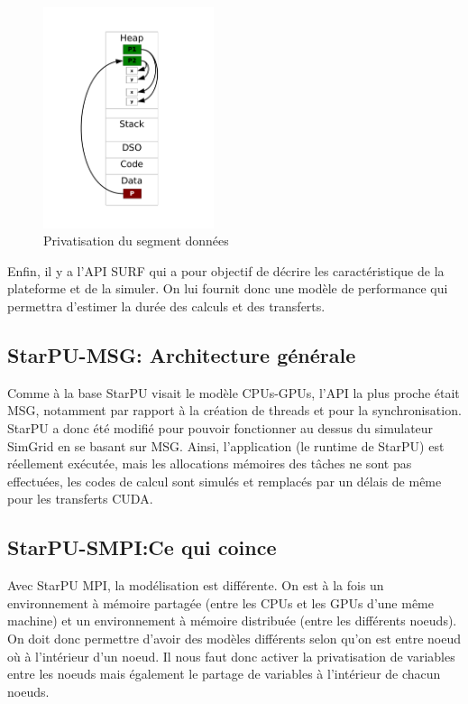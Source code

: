 \documentclass[smallextended]{svjour3}
\begin{document}
\begin{figure}[htb]
\centering
\includegraphics[width=5cm]{./Img/Memoire.pdf}
\caption{\label{fig:1}Privatisation du segment données}
\end{figure}

Enfin, il y a l'API SURF qui a pour objectif de décrire les
caractéristique de la plateforme et de la simuler. On lui fournit
donc une modèle de performance qui permettra d'estimer la durée des
calculs et des transferts.

\subsection{StarPU-MSG: Architecture générale}
\label{sec-3-2}
Comme à la base StarPU visait le modèle CPUs-GPUs, l'API la plus
proche était MSG, notamment par rapport à la création de threads et
pour la synchronisation. StarPU a donc été modifié pour pouvoir
fonctionner au dessus du simulateur SimGrid en se basant sur
MSG. Ainsi, l'application (le runtime de StarPU) est réellement
exécutée, mais les allocations mémoires des tâches ne sont pas
effectuées, les codes de calcul sont simulés et remplacés par un
délais de même pour les transferts CUDA. 

\subsection{StarPU-SMPI:Ce qui coince}
\label{sec-3-3}
Avec StarPU MPI, la modélisation est différente. On est à la fois
un environnement à mémoire partagée (entre les CPUs et les GPUs
d'une même machine) et un environnement à mémoire distribuée
(entre les différents noeuds). On doit donc permettre d'avoir des
modèles différents selon qu'on est entre noeud où à l'intérieur
d'un noeud. Il nous faut donc activer la privatisation de variables
entre les noeuds mais également le partage de variables à
l'intérieur de chacun noeuds. 
\end{document}
